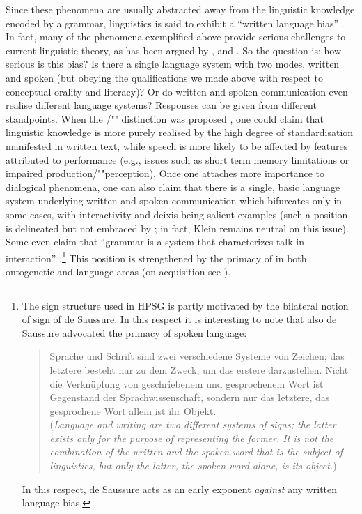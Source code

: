 \documentclass[output=paper]{langsci/langscibook}
\begin{document}
{
Since these phenomena are usually abstracted away from the linguistic knowledge encoded by a grammar, linguistics is said to exhibit a \enquote{written language bias}  \citep{Linell:2005}.
%
In fact, many of the phenomena exemplified above provide serious challenges  to current  linguistic theory, as has been argued by \citet{Ginzburg:2012}, \citet{Ginzburg:Poesio:2016} and \citet{Kempson:Cann:Gregoromichelaki:Chatzikyriakidis:2016}.
%
So the question is: how serious is this bias? 
%
Is there a single language system with two modes, written and spoken (but obeying the qualifications we made above with respect to conceptual orality and literacy)?
%
Or do written and spoken communication even realise different language systems?
%
Responses can be given from different standpoints. 
%
When the /""  distinction was proposed \citep{Chomsky:1969}, one could claim that linguistic knowledge is more purely realised by the high degree of standardisation manifested in written text, while speech is more likely to be affected by features attributed to performance (e.g.,   issues such as short term memory limitations or impaired production/""perception).
%
Once one attaches more importance to dialogical phenomena, one can also claim that there is a single, basic language system underlying written and spoken communication which bifurcates only in some cases, with interactivity and deixis being salient examples (such a position is delineated but not embraced by \citet{Klein:1985}; in fact, Klein remains neutral on this issue). 
%
Some even claim that \enquote{grammar is a system that characterizes talk in interaction} \citep[]{Ginzburg:Poesio:2016}.\footnote{The sign structure used in HPSG is partly motivated by the bilateral notion of sign of de Saussure.  In this respect it is interesting to note that also de Saussure advocated the primacy of spoken language:
\begin{quote}
    Sprache und Schrift sind zwei verschiedene Systeme von Zeichen; das letztere besteht nur zu dem Zweck, um das erstere darzustellen. Nicht die Verknüpfung von geschriebenem und gesprochenem Wort ist Gegenstand der Sprachwissenschaft, sondern nur das letztere, das gesprochene Wort allein ist ihr Objekt. \citep[]{de:Saussure:2001:DE} \\
    (\textit{Language and writing are two different systems of signs; the latter exists only for the purpose of representing the former. It is not the combination of the written and the spoken word that is the subject of linguistics, but only the latter, the spoken word alone, is its object.})
\end{quote}
In this respect, de Saussure acts as an early exponent \emph{against} any written language bias.
}
%
This position is strengthened by the primacy of  in both ontogenetic and language  areas (on acquisition see ).

}
\end{document}
